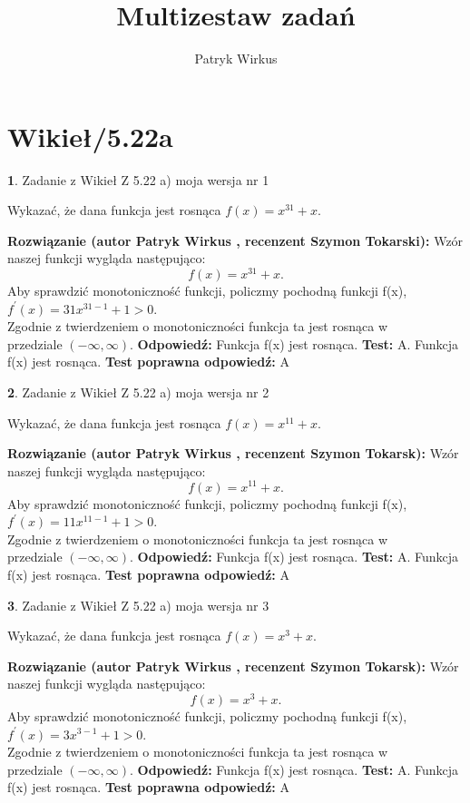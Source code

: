 \documentclass[12pt, a4paper]{article}
\title{Multizestaw zadań}
\author{Patryk Wirkus}
\date{}
\theoremstyle{definition} %
\newtheorem{zad}{}
\newcommand{\kategoria}[1]{\section{#1}}
\newcommand{\zadStart}[1]{\begin{zad}#1\newline}
\newcommand{\zadStop}{\end{zad}}
\newcommand{\rozwStart}[2]{\noindent \textbf{Rozwiązanie (autor #1 , recenzent #2): }\newline}
\newcommand{\rozwStop}{\newline}
\newcommand{\odpStart}{\noindent \textbf{Odpowiedź:}\newline}
\newcommand{\odpStop}{\newline}
\newcommand{\testStart}{\noindent \textbf{Test:}\newline}
\newcommand{\testStop}{\newline}
\newcommand{\kluczStart}{\noindent \textbf{Test poprawna odpowiedź:}\newline}
\newcommand{\kluczStop}{\newline}
\begin{document}
\maketitle

\kategoria{Wikieł/5.22a}


\zadStart{Zadanie z Wikieł Z 5.22 a) moja wersja nr 1}

Wykazać, że dana funkcja jest rosnąca $f(x) = x^{31}+x$.
\zadStop
\rozwStart{Patryk Wirkus}{Szymon Tokarski}
Wzór naszej funkcji wygląda następująco:
$$f(x) = x^{31}+x.$$
Aby sprawdzić monotoniczność funkcji, policzmy pochodną funkcji f(x),\\ $f^{'}(x) = 31x^{31-1}+1 > 0$.\\
Zgodnie z twierdzeniem o monotoniczności funkcja ta jest rosnąca w\\ przedziale $(-\infty,\infty)$.
\rozwStop
\odpStart
Funkcja f(x) jest rosnąca.
\odpStop
\testStart
A. Funkcja f(x) jest rosnąca.
\testStop
\kluczStart
A
\kluczStop



\zadStart{Zadanie z Wikieł Z 5.22 a) moja wersja nr 2}

Wykazać, że dana funkcja jest rosnąca $f(x) = x^{11}+x$.
\zadStop
\rozwStart{Patryk Wirkus}{Szymon Tokarsk}
Wzór naszej funkcji wygląda następująco:
$$f(x) = x^{11}+x.$$
Aby sprawdzić monotoniczność funkcji, policzmy pochodną funkcji f(x),\\ $f^{'}(x) = 11x^{11-1}+1 > 0$.\\
Zgodnie z twierdzeniem o monotoniczności funkcja ta jest rosnąca w\\ przedziale $(-\infty,\infty)$.
\rozwStop
\odpStart
Funkcja f(x) jest rosnąca.
\odpStop
\testStart
A. Funkcja f(x) jest rosnąca.
\testStop
\kluczStart
A
\kluczStop



\zadStart{Zadanie z Wikieł Z 5.22 a) moja wersja nr 3}

Wykazać, że dana funkcja jest rosnąca $f(x) = x^{3}+x$.
\zadStop
\rozwStart{Patryk Wirkus}{Szymon Tokarsk}
Wzór naszej funkcji wygląda następująco:
$$f(x) = x^{3}+x.$$
Aby sprawdzić monotoniczność funkcji, policzmy pochodną funkcji f(x),\\ $f^{'}(x) = 3x^{3-1}+1 > 0$.\\
Zgodnie z twierdzeniem o monotoniczności funkcja ta jest rosnąca w\\ przedziale $(-\infty,\infty)$.
\rozwStop
\odpStart
Funkcja f(x) jest rosnąca.
\odpStop
\testStart
A. Funkcja f(x) jest rosnąca.
\testStop
\kluczStart
A
\kluczStop
\end{document}
